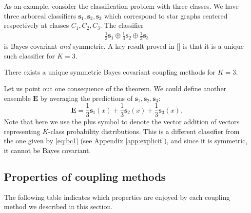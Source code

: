 As an example, consider the classification problem with three classes. We have three arboreal classifiers $\boldsymbol{s}_1, \boldsymbol{s}_2, \boldsymbol{s}_3$ which correspond to star graphs centered respectively at classes $C_1, C_2, C_3$. The classifier 
\begin{align}
\frac13 \boldsymbol{s}_1 \oplus \frac13 \boldsymbol{s}_2 \oplus \frac 13 \boldsymbol{s}_3  \label{eq:bc1}
\end{align}
is Bayes covariant \emph{and} symmetric. A key result proved in [\cite{vsuch2016bayes}] is that it is a unique such classifier for $K=3$.

\begin{thm} \label{thm:K3}
	There exists a unique symmetric Bayes covariant coupling methods for $K=3$.
\end{thm}

Let us point out one consequence of the theorem. We could define another ensemble $\boldsymbol{E}$ by averaging the predictions of $\boldsymbol{s}_1, \boldsymbol{s}_2, \boldsymbol{s}_3$:
\[
\boldsymbol{E} = \frac13 \boldsymbol{s}_1(x) + \frac13 \boldsymbol{s}_2(x) + \frac 13 \boldsymbol{s}_3(x).
\]
Note that here we use the plus symbol to denote the vector addition of vectors representing $K$-class probability distributions. This is a different classifier from the one given by  \eqref{eq:bc1} (see Appendix \ref{app:explicit}), and since it is symmetric, it cannot be Bayes covariant.

\subsection{Properties of coupling methods}


The following table indicates which properties are enjoyed by each coupling method we described in this section.

